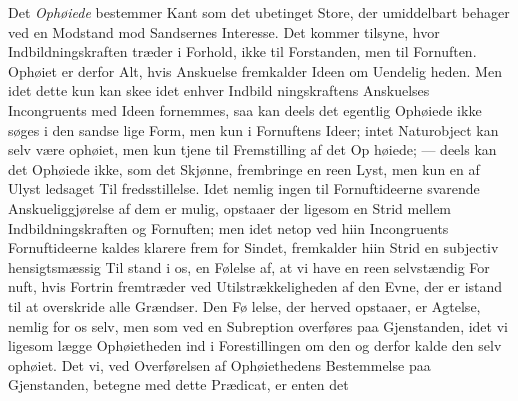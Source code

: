 \documentclass[12pt,a4paper]{book}
\begin{document}
Det \emph{Ophøiede} bestemmer Kant som det ubetinget Store,
der umiddelbart behager ved en Modstand mod Sandsernes
Interesse. Det kommer tilsyne, hvor Indbildningskraften træder
i Forhold, ikke til Forstanden, men til Fornuften. Ophøiet
er derfor Alt, hvis Anskuelse fremkalder Ideen om Uendelig\-%
heden. Men idet dette kun kan skee idet enhver Indbild\-%
ningskraftens Anskuelses Incongruents med Ideen fornemmes,
saa kan deels det egentlig Ophøiede ikke søges i den sandse\-%
lige Form, men kun i Fornuftens Ideer; intet Naturobject kan
selv være ophøiet, men kun tjene til Fremstilling af det Op\-%
høiede; --- deels kan det Ophøiede ikke, som det Skjønne,
frembringe en reen Lyst, men kun en af Ulyst ledsaget Til\-%
fredsstillelse. Idet nemlig ingen til Fornuftideerne svarende
Anskueliggjørelse af dem er mulig, opstaaer der ligesom en
Strid mellem Indbildningskraften og Fornuften; men idet netop
ved hiin Incongruents Fornuftideerne kaldes klarere frem for
Sindet, fremkalder hiin Strid en subjectiv hensigtsmæssig Til\-%
stand i os, en Følelse af, at vi have en reen selvstændig For\-%
nuft, hvis Fortrin fremtræder ved Utilstrækkeligheden af den
Evne, der er istand til at overskride alle Grændser. Den Fø\-%
lelse, der herved opstaaer, er Agtelse, nemlig for os selv, men
som ved en Subreption overføres paa Gjenstanden, idet vi
ligesom lægge Ophøietheden ind i Forestillingen om den og
derfor kalde den selv ophøiet.
Det vi, ved Overførelsen af Ophøiethedens Bestemmelse
paa Gjenstanden, betegne med dette Prædicat, er enten det
\end{document}
